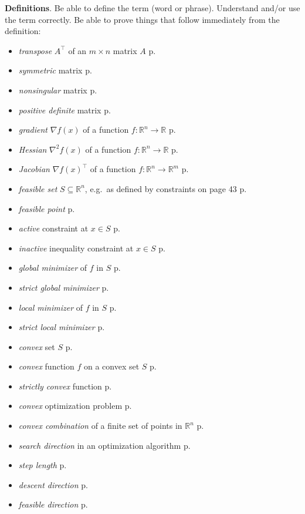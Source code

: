\documentclass[12pt]{amsart}
\newcommand{\bigspacing}{\renewcommand{\baselinestretch}{1.13}\tiny\normalsize}
\newcommand{\RR}{{\mathbb{R}}}
\newcommand{\grad}{\nabla}
\begin{document}
\vfill

\newcommand{\pb}{\hfill p.~\underline{\phantom{foobar}}}
\newcommand{\psb}{\hfill pp.~\underline{\phantom{foobar}}}

\medskip
\bigspacing
\noindent \textbf{Definitions}.  Be able to define the term (word or phrase).  Understand and/or use the term correctly.  Be able to prove things that follow immediately from the definition:
\begin{itemize}
\item \emph{transpose} $A^\top$ of an $m\times n$ matrix $A$ \pb
\item \emph{symmetric} matrix \pb
\item \emph{nonsingular} matrix \pb
\item \emph{positive definite} matrix \pb
\item \emph{gradient} $\grad f(x)$ of a function $f:\RR^n\to\RR$ \pb
\item \emph{Hessian} $\grad^2 f(x)$ of a function $f:\RR^n\to\RR$ \pb
\item \emph{Jacobian} $\grad f(x)^\top$ of a function $f:\RR^n\to\RR^m$ \pb
\item \emph{feasible set} $S \subseteq \RR^n$, e.g.~as defined by constraints on page 43 \pb
\item \emph{feasible point} \pb
\item \emph{active} constraint at $x\in S$ \pb
\item \emph{inactive} inequality constraint at $x\in S$ \pb
\item \emph{global minimizer} of $f$ in $S$ \pb
\item \emph{strict global minimizer} \pb
\item \emph{local minimizer} of $f$ in $S$ \pb
\item \emph{strict local minimizer} \pb
\item \emph{convex} set $S$ \pb
\item \emph{convex} function $f$ on a convex set $S$ \pb
\item \emph{strictly convex} function \pb
\item \emph{convex} optimization problem \pb
\item \emph{convex combination} of a finite set of points in $\RR^n$ \pb
\item \emph{search direction} in an optimization algorithm \pb
\item \emph{step length} \pb
\item \emph{descent direction} \pb
\item \emph{feasible direction} \pb

\end{itemize}
\end{document}
